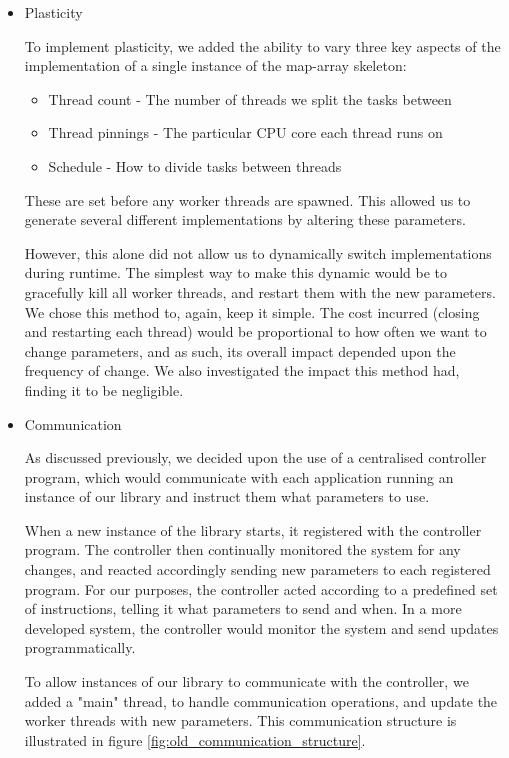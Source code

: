 \begin{itemize}
    \item Plasticity
    
        To implement plasticity, we added the ability to vary three key aspects of the implementation of a single instance of the map-array skeleton:
    
        \begin{itemize}
        	\item Thread count - The number of threads we split the tasks between
        	\item Thread pinnings - The particular CPU core each thread runs on
        	\item Schedule - How to divide tasks between threads
        \end{itemize}
        
        These are set before any worker threads are spawned. This allowed us to generate several different implementations by altering these parameters.
        
        However, this alone did not allow us to dynamically switch implementations during runtime. The simplest way to make this dynamic would be to gracefully kill all worker threads, and restart them with the new parameters. We chose this method to, again, keep it simple. The cost incurred (closing and restarting each thread) would be proportional to how often we want to change parameters, and as such, its overall impact depended upon the frequency of change. We also investigated the impact this method had, finding it to be negligible.
    
    \item Communication
    
        As discussed previously, we decided upon the use of a centralised controller program, which would communicate with each application running an instance of our library and instruct them what parameters to use.
        
        When a new instance of the library starts, it registered with the controller program. The controller then continually monitored the system for any changes, and reacted accordingly sending new parameters to each registered program. For our purposes, the controller acted according to a predefined set of instructions, telling it what parameters to send and when. In a more developed system, the controller would monitor the system and send updates programmatically.
        
        To allow instances of our library to communicate with the controller, we added a "main" thread, to handle communication operations, and update the worker threads with new parameters. This communication structure is illustrated in figure \ref{fig:old_communication_structure}.
        

\end{itemize}
